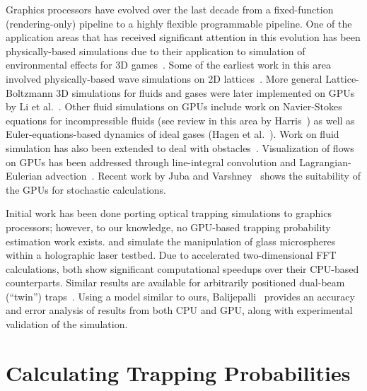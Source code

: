 \documentclass[twocolumn,10pt]{asme2ej}
\begin{document}
Graphics processors have evolved over the last decade from a
fixed-function (rendering-only) pipeline to a highly flexible
programmable pipeline.  One of the application areas that has received
significant attention in this evolution has been physically-based
simulations due to their application to simulation of environmental
effects for 3D games~\cite{Owens:2007:ASO}. Some of the earliest work
in this area involved physically-based wave simulations on 2D
lattices~\cite{James:2001:operations}. More general Lattice-Boltzmann
3D simulations for fluids and gases were later implemented on GPUs by
Li et al.~\cite{LWK03,LFWK05}. Other fluid simulations on GPUs include
work on Navier-Stokes equations for incompressible fluids (see review
in this area by Harris~\cite{Harris:2005:fast-fluid}) as well as
Euler-equations-based dynamics of ideal gases (Hagen et
al.~\cite{Hagen:2006:euler}). Work on fluid simulation has also been
extended to deal with
obstacles~\cite{Bolz:2003:sparse,KW03,LLW04,STM04,Harris:2005:fast-fluid}. Visualization
of flows on GPUs has been addressed through line-integral convolution
and Lagrangian-Eulerian
advection~\cite{Heidrich:1999:pixel-textures,JEH01,WHE01}.  Recent
work by Juba and Varshney~\cite{Juba:2008:PSMM} shows the suitability
of the GPUs for stochastic calculations.

Initial work has been done porting optical trapping simulations to
graphics processors; however, to our knowledge, no GPU-based trapping
probability estimation work exists.  \cite{reicherter:59301Y} and
\cite{haist2006using} simulate the manipulation of glass microspheres
within a holographic laser testbed.  Due to accelerated
two-dimensional FFT calculations, both show significant computational
speedups over their CPU-based counterparts.  Similar results are
available for arbitrarily positioned dual-beam (``twin'')
traps~\cite{hermerschmidt2007holographic}.  Using a model similar to
ours, Balijepalli~\cite{balijepalli2010stochastic} provides an
accuracy and error analysis of results from both CPU and GPU, along
with experimental validation of the simulation.





\section{Calculating Trapping Probabilities}
\label{sec:calculating-trapping-probabilities}

\end{document}
